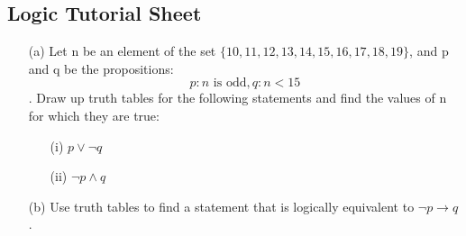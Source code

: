 \documentclass[]{article}
\begin{document}
\subsection*{Logic Tutorial Sheet}

\begin{itemize}
\item[(a)] Let n be an element of the set $\{10, 11, 12, 13, 14, 15, 16, 17, 18, 19\}$,
and p and q be the propositions:
\[p : n \mbox{ is odd},   q : n < 15\]. Draw up truth tables for the following statements and find the values of n for
which they are true:
\begin{itemize}
\item[(i)] $ p \vee \neg q$ 
\item[(ii)] $\neg p \wedge q$
\end{itemize}
\item[(b)] Use truth tables to find a statement that is logically equivalent to $\neg p \rightarrow q$.
\end{itemize}
\end{document}
